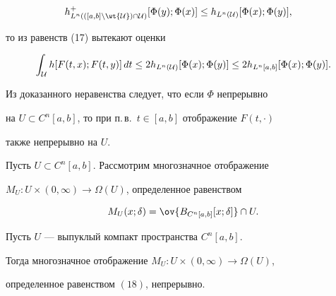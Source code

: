 \begin{pf}
\begin{align*}
h^+_{L^n(([a,b]\backslash\wt{\cal U})\cap{\cal U})}[\Phi(y);\Phi(x)]


&\le h_{L^n(\cal U)}[\Phi(x);\Phi(y)],


\end{align*}


то из равенств (17) вытекают оценки


$$


\int_{\cal U}h[F(t,x);F(t,y)]\,dt\le


2h_{L^n(\cal U)}[\Phi(x);\Phi(y)]\le 2h_{L^n[a,b]}[\Phi(x);\Phi(y)].


$$


Из доказанного неравенства следует, что если $\Phi$ непрерывно


на $U\subset C^n[a,b]$, то при п.\,в.~$t\in[a,b]$ отображение $F(t,\cdot)$


также непрерывно на $U$.


\end{pf}





Пусть $U\subset C^n[a,b]$. Рассмотрим многозначное отображение


$M_U:U\times(0,\infty)\to\Omega(U)$, определенное равенством


\begin{equation}


M_U(x;\delta)=\ov{B_{C^n[a,b]}[x;\delta]}\cap U.


\end{equation}





\begin{lem} Пусть $U$ --- выпуклый компакт пространства $C^n[a,b]$.


Тогда многозначное отображение $M_U:U\times(0,\infty)\to\Omega(U)$,


определенное равенством $(18)$, непрерывно.


\end{lem}





